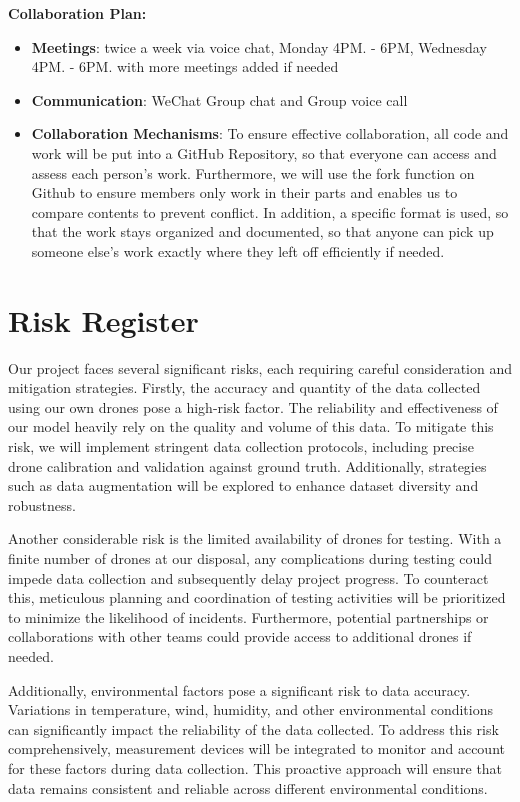 \documentclass{article} %
\begin{document}
\textbf{Collaboration Plan:}
  \begin{itemize}
    \item \textbf{Meetings}: twice a week via voice chat, Monday 4PM. - 6PM, Wednesday 4PM. - 6PM. with more meetings added if needed
    \item \textbf{Communication}: WeChat Group chat and Group voice call
    \item \textbf{Collaboration Mechanisms}: To ensure effective collaboration, all code and work will be put into a GitHub Repository, so that everyone can access and assess each person's work. Furthermore, we will use the fork function on Github to ensure members only work in their parts and enables us to compare contents to prevent conflict. In addition, a specific format is used, so that the work stays organized and documented, so that anyone can pick up someone else's work exactly where they left off efficiently if needed.
  \end{itemize}





\section{Risk Register}

Our project faces several significant risks, each requiring careful consideration and mitigation strategies. Firstly, the accuracy and quantity of the data collected using our own drones pose a high-risk factor. The reliability and effectiveness of our model heavily rely on the quality and volume of this data. To mitigate this risk, we will implement stringent data collection protocols, including precise drone calibration and validation against ground truth. Additionally, strategies such as data augmentation will be explored to enhance dataset diversity and robustness.

Another considerable risk is the limited availability of drones for testing. With a finite number of drones at our disposal, any complications during testing could impede data collection and subsequently delay project progress. To counteract this, meticulous planning and coordination of testing activities will be prioritized to minimize the likelihood of incidents. Furthermore, potential partnerships or collaborations with other teams could provide access to additional drones if needed.

Additionally, environmental factors pose a significant risk to data accuracy. Variations in temperature, wind, humidity, and other environmental conditions can significantly impact the reliability of the data collected. \citep{advancednavigation_imu}To address this risk comprehensively, measurement devices will be integrated to monitor and account for these factors during data collection. This proactive approach will ensure that data remains consistent and reliable across different environmental conditions.
\end{document}
